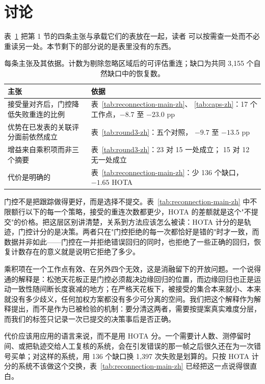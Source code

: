 \section{讨论}

表~\ref{tab:claims-zh} 把第 1 节的四条主张与承载它们的表放在一起，读者
可以按需查一处而不必重读另一处。本节剩下的部分说的是表里没有的东西。

\begin{table}[t]
\centering
\footnotesize
\setlength{\tabcolsep}{4pt}
\caption{每条主张及其依据。计数为剔除忽略区域后的可评估重连；缺口为共同
3,155 个自然缺口中的恢复数。}
\label{tab:claims-zh}
\begin{tabular}{p{4.2cm}p{3.0cm}}
\hline
主张 & 依据 \\
\hline
接受量对齐后，门控降低失败重连的比例 & 表~\ref{tab:reconnection-main-zh}、
\ref{tab:caps-zh}：17 个工作点，$-8.7$ 至 $-23.0$ pp \\
优势在已发表的关联评分面前依然成立 & 表~\ref{tab:round3-zh}：五个对照，
$-9.7$ 至 $-13.5$ pp \\
增益来自乘积项而非三个摘要 & 表~\ref{tab:round3-zh}：23 对 15 一处成立；
15 对 12 无一处成立 \\
代价是明确的 & 表~\ref{tab:reconnection-main-zh}：少 136 个缺口，
$-1.65$ HOTA \\
\hline
\end{tabular}
\end{table}

门控不是把跟踪做得更好，而是选择不提交。表~\ref{tab:reconnection-main-zh} 中不限额行以下的每一个策略，接受的重连次数都更少，HOTA 的差额就是这个"不提交"的价格。把这层区别讲清楚，关系到方法应该怎么被读：HOTA 计分的是轨迹，门控计分的是决策。两者只在"门控拒绝的每一次都恰好是错的"时才一致，而数据并非如此——门控在一并拒绝错误回归的同时，也拒绝了一些正确的回归，恢复计数存在的意义就是说明它拒绝了多少。

乘积项在一个工作点有效、在另外四个无效，这是消融留下的开放问题。一个说得通的解释是：松弛天花板正是门控必须裁决边缘回归的位置，而边缘回归也正是运动一致性随间断长度衰减的地方；在严格天花板下，被接受的集合本来就小、本来就没有多少歧义，任何加权方案都没有多少可分离的空间。我们把这个解释作为解释提出，而不是作为已被检验的机制：要分清这两者，需要按提案真实难度分层，而我们的标签只记录一次已提交的决策事后是否正确。

代价应该用应用的语言来说，而不是用 HOTA 分。一个需要计人数、测停留时间、或把轨迹交给人工复核的系统，会在引发错误的那一帧之后很久还在为一次错号买单；对这样的系统，用 136 个缺口换 1,397 次失败是划算的。只按 HOTA 计分的系统不该做这个交换，表~\ref{tab:reconnection-main-zh} 已经把这一点说得很直白。

